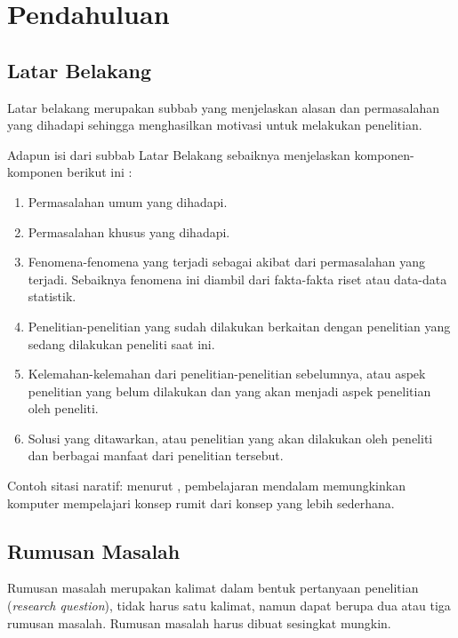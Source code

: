 \chapter{Pendahuluan}
\label{bab:pendahuluan}

\section{Latar Belakang}
\label{sec:latar}

Latar belakang merupakan subbab yang menjelaskan alasan dan permasalahan yang dihadapi sehingga menghasilkan motivasi untuk melakukan penelitian. 

Adapun isi dari subbab Latar Belakang sebaiknya menjelaskan komponen-komponen berikut ini \parencite{lecun2015deep}:
\begin{enumerate}
  \item Permasalahan umum yang dihadapi.
  \item Permasalahan khusus yang dihadapi.
  \item Fenomena-fenomena yang terjadi sebagai akibat dari permasalahan yang terjadi. Sebaiknya fenomena ini diambil dari fakta-fakta riset atau data-data statistik.
  \item Penelitian-penelitian yang sudah dilakukan berkaitan dengan penelitian yang sedang dilakukan peneliti saat ini.
  \item Kelemahan-kelemahan dari penelitian-penelitian sebelumnya, atau aspek penelitian yang belum dilakukan dan yang akan menjadi aspek penelitian oleh peneliti.
  \item Solusi yang ditawarkan, atau penelitian yang akan dilakukan oleh peneliti dan berbagai manfaat dari penelitian tersebut.
\end{enumerate}

Contoh sitasi naratif: menurut \textcite{goodfellow2016deep}, pembelajaran mendalam memungkinkan komputer mempelajari konsep rumit dari konsep yang lebih sederhana.

\section{Rumusan Masalah}
\label{sec:rumusan}

Rumusan masalah merupakan kalimat dalam bentuk pertanyaan penelitian (\textit{research question}), tidak harus satu kalimat, namun dapat berupa dua atau tiga rumusan masalah. Rumusan masalah harus dibuat sesingkat mungkin.

